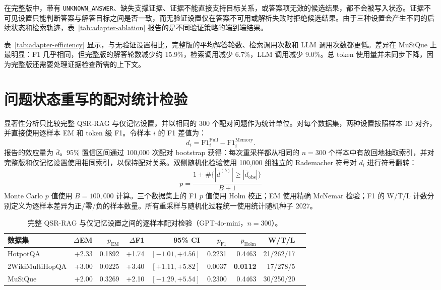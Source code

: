 \documentclass[11pt]{article}
\begin{document}
	在完整版中，带有 \texttt{UNKNOWN\_ANSWER}、缺失支撑证据、证据不能直接支持目标关系，或答案项无效的候选结果，都不会被写入状态。证据不可见设置只能判断答案与解答目标之间是否一致，而无验证设置仅在答案不可用或解析失败时拒绝候选结果。由于三种设置会产生不同的后续状态和检索轨迹，表~\ref{tab:adapter-ablation} 报告的是不同验证策略的端到端结果。

	表~\ref{tab:adapter-efficiency} 显示，与无验证设置相比，完整版的平均解答轮数、检索调用次数和 LLM 调用次数都更低。差异在 MuSiQue 上最明显：F1 几乎相同，但完整版的解答轮数减少约 15.9\%，检索调用减少 6.7\%，LLM 调用减少 9.0\%。总 token 使用量并未同步下降，因为完整版还需要处理证据检查所需的上下文。


	\section{问题状态重写的配对统计检验}
	\label{app:state-significance}

	显著性分析只比较完整 QSR-RAG 与仅记忆设置，并以相同的 300 个配对问题作为统计单位。对每个数据集，两种设置按照样本 ID 对齐，并直接使用逐样本 EM 和 token 级 F1。令样本 $i$ 的 F1 差值为：
	\begin{equation}
		d_i = \mathrm{F1}^{\mathrm{Full}}_i-\mathrm{F1}^{\mathrm{Memory}}_i.
	\end{equation}
	报告的效应量为 $\bar d$。95\% 置信区间通过 100,000 次配对 bootstrap 获得：每次重采样都从相同的 $n=300$ 个样本中有放回地抽取索引，并对完整版和仅记忆设置使用相同索引，以保持配对关系。双侧随机化检验使用 100,000 组独立的 Rademacher 符号对 $d_i$ 进行符号翻转：
	\begin{equation}
		p = \frac{1+\#\{|\bar d^{(b)}|\ge|\bar d_{\mathrm{obs}}|\}}{B+1}
	\end{equation}
	Monte Carlo $p$ 值使用 $B=100{,}000$ 计算。三个数据集上的 F1 $p$ 值使用 Holm 校正；EM 使用精确 McNemar 检验；F1 的 W/T/L 计数分别定义为逐样本差异为正/零/负的样本数量。所有重采样与随机化过程统一使用统计随机种子 2027。

	\begin{table}[t]
		\centering
		\caption{完整 QSR-RAG 与仅记忆设置之间的逐样本配对检验（GPT-4o-mini，$n=300$）。}
		\label{tab:state-significance}
		\scriptsize
		\setlength{\tabcolsep}{3.3pt}
		\begin{tabular}{lrrrrrrrr}
			\toprule
			数据集 & $\Delta$EM & $p_{\mathrm{EM}}$ & $\Delta$F1 & 95\% CI & $p_{\mathrm{F1}}$ & $p_{\mathrm{Holm}}$ & W/T/L\\
			\midrule
			HotpotQA        & +2.33 & 0.1892 & +1.74 & $[-1.01,+4.56]$ & 0.2231 & 0.4463 & 21/262/17\\
			2WikiMultiHopQA & +3.00 & 0.0225 & +3.40 & $[+1.11,+5.82]$ & 0.0037 & \textbf{0.0112} & 17/278/5\\
			MuSiQue         & +2.00 & 0.3269 & +2.10 & $[-1.29,+5.54]$ & 0.2300 & 0.4463 & 30/250/20\\
			\bottomrule
		\end{tabular}
	\end{table}
\end{document}
